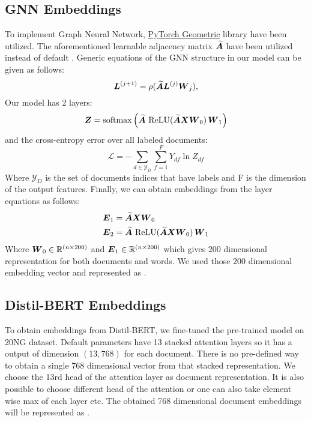 \subsection{GNN Embeddings}
To implement Graph Neural Network, \href{https://pytorch-geometric.readthedocs.io/en/latest/}{PyTorch Geometric} library have been utilized. The aforementioned learnable adjacency matrix \(\boldsymbol{\widetilde{A}}\) have been utilized instead of default . Generic equations of the GNN structure in our model can be given as follows:
\begin{equation}
    \boldsymbol{L}^{(j+1)} = \rho (\boldsymbol{\widetilde{A}}\boldsymbol{L}^{(j)}\boldsymbol{W}_j),
    \label{eq2}
\end{equation}
Our model has 2 layers:
\begin{equation}
    \boldsymbol{Z} = \operatorname{softmax}\left(\boldsymbol{\widetilde{A}}\,\operatorname{ReLU}(\boldsymbol{\widetilde{A}}\boldsymbol{X}\boldsymbol{W}_0)\,\boldsymbol{W}_1\right)
\end{equation}
and the cross-entropy error over all labeled documents:
\begin{equation}
    \mathcal{L} = -\sum_{d \in \mathcal{Y}_D}^{} \sum_{f= 1}^{F} Y_{df}\ln Z_{df}
\end{equation}
Where {\small{}\(\mathcal{Y}_D\)} is the set of documents indices that have labels and F is the dimension of the output features.
Finally, we can obtain embeddings from the layer equations as follows:
\begin{align}
    \boldsymbol{E}_1 & = \boldsymbol{\widetilde{A}}\boldsymbol{X}\boldsymbol{W}_0                                                      \\
    \boldsymbol{E}_2 & = \boldsymbol{\widetilde{A}}\,\operatorname{ReLU}(\boldsymbol{\widetilde{A}}\boldsymbol{X}\boldsymbol{W}_0)\,\boldsymbol{W}_1
\end{align}
Where \(\boldsymbol{W}_0 \in \mathbb{R}^{(n \times 200)}\) and \(\boldsymbol{E}_1 \in \mathbb{R}^{(n\times200)}\) which gives 200 dimensional representation for both documents and words. We used those 200 dimensional embedding vector and represented as \GNNEM{}.

\subsection{Distil-BERT Embeddings}
To obtain embeddings from Distil-BERT, we fine-tuned the pre-trained model on 20NG dataset. Default parameters have 13 stacked attention layers so it has a output of dimension \((13,768)\) for each document. There is no pre-defined way to obtain a single 768 dimensional vector from that stacked representation. We choose the 13rd head of the attention layer as document representation. It is also possible to choose different head of the attention or one can also take element wise max of each layer etc. The obtained 768 dimensional document embeddings will be represented as \BERTEM{}.

